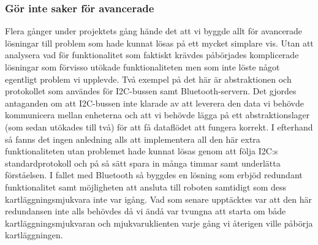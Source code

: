 \documentclass{article}
\begin{document}
\subsubsection{Gör inte saker för avancerade}
Flera gånger under projektets gång hände det att vi byggde allt för avancerade lösningar till problem som hade kunnat lösas på ett mycket simplare vis. Utan att analysera vad för funktionalitet som faktiskt krävdes påbörjades komplicerade lösningar som förvisso utökade funktionaliteten men som inte löste något egentligt problem vi upplevde. Två exempel på det här är abstraktionen och protokollet som användes för I2C-bussen samt Bluetooth-servern.
\newline\newline
Det gjordes antaganden om att I2C-bussen inte klarade av att leverera den data vi behövde kommunicera mellan enheterna och att vi behövde lägga på ett abstraktionslager (som sedan utökades till två) för att få dataflödet att fungera korrekt. I efterhand så fanns det ingen anledning alls att implementera all den här extra funktionaliteten utan problemet hade kunnat lösas genom att följa I2C:s standardprotokoll och på så sätt spara in många timmar samt underlätta förståelsen.
\newline\newline
I fallet med Bluetooth så byggdes en lösning som erbjöd redundant funktionalitet samt möjligheten att ansluta till roboten samtidigt som dess kartläggningsmjukvara inte var igång. Vad som senare upptäcktes var att den här redundansen inte alls behövdes då vi ändå var tvungna att starta om både kartläggningsmjukvaran och mjukvaruklienten varje gång vi återigen ville påbörja kartläggningen.
\end{document}

